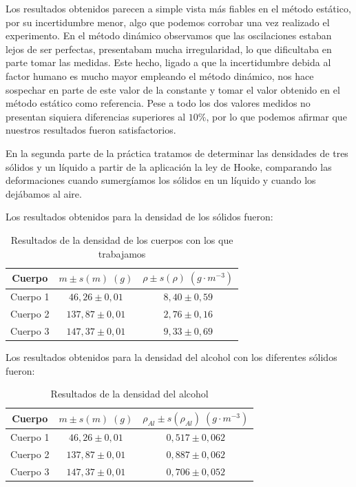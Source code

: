 \documentclass[a4paper,12pt,titlepage]{article}
\begin{document}
Los resultados obtenidos parecen a simple vista más fiables en el método estático, por su incertidumbre menor, algo que podemos corrobar una vez realizado el experimento. En el método dinámico observamos que las oscilaciones estaban lejos de ser perfectas, presentabam mucha irregularidad, lo que dificultaba en parte tomar las medidas. Este hecho, ligado a que la incertidumbre debida al factor humano es mucho mayor empleando el método dinámico, nos hace sospechar en parte de este valor de la constante y tomar el valor obtenido en el método estático como referencia. Pese a todo los dos valores medidos no presentan siquiera diferencias superiores al $10\%$, por lo que podemos afirmar que nuestros resultados fueron satisfactorios.

\par En la segunda parte de la práctica tratamos de determinar las densidades de tres sólidos y un líquido a partir de la aplicación la ley de Hooke, comparando las deformaciones cuando sumergíamos los sólidos en un líquido y cuando los dejábamos al aire. 

\par Los resultados obtenidos para la densidad de los sólidos fueron:

\begin{table}[h!]
    \centering
    \begin{tabular}{|c|c|c|}
        \hline
        Cuerpo & $m \pm s(m) \; (g)$ & $\rho \pm s(\rho) \; (g\cdot m^{-3})$ \\ \hline
        Cuerpo 1 & $46,26 \pm 0,01$ & $8,40 \pm 0,59$ \\ \hline
        Cuerpo 2 & $137,87 \pm 0,01$ & $2,76 \pm 0,16$\\ \hline
        Cuerpo 3 & $147,37 \pm 0,01$& $9,33 \pm 0,69$ \\ \hline
    \end{tabular}
    \caption{Resultados de la densidad de los cuerpos con los que trabajamos}
\end{table}

Los resultados obtenidos para la densidad del alcohol con los diferentes sólidos fueron:

\begin{table}[h!]
    \centering
    \begin{tabular}{|c|c|c|}
        \hline
        Cuerpo & $m \pm s(m) \; (g)$ & $\rho_{Al} \pm s(\rho_{Al}) \; (g\cdot m^{-3})$ \\ \hline
        Cuerpo 1 & $46,26 \pm 0,01$ & $0,517 \pm 0,062$ \\ \hline
        Cuerpo 2 & $137,87 \pm 0,01$ & $0,887 \pm 0,062$\\ \hline
        Cuerpo 3 & $147,37 \pm 0,01$& $0,706 \pm 0,052$ \\ \hline
    \end{tabular}
    \caption{Resultados de la densidad del alcohol}
\end{table}
\end{document}
